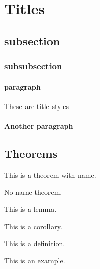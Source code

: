 \documentclass[lineno=off]{wunschnote}
\begin{document}
    \maketitle

    \section{Titles}
    \subsection{subsection}
    \subsubsection{subsubsection}
    \paragraph{paragraph} These are title styles

    \paragraph{Another paragraph}
    \lipsum[2]

    \subsection{Theorems}

    \begin{theorem}
        This is a theorem with name.
    \end{theorem}

    \begin{theorem}
        No name theorem.
    \end{theorem}

    \begin{lemma}
        This is a lemma.
    \end{lemma}

    \begin{corollary}
        This is a corollary.
    \end{corollary}

    \begin{definition}
        This is a definition.
    \end{definition}

    \begin{example}
        This is an example.
    \end{example}
\end{document}
